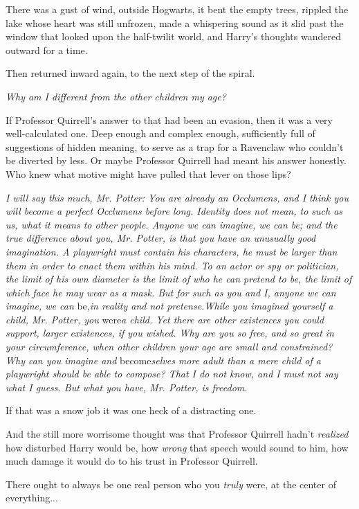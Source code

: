 There was a gust of wind, outside Hogwarts, it bent the empty trees,
rippled the lake whose heart was still unfrozen, made a whispering sound
as it slid past the window that looked upon the half-twilit world, and
Harry's thoughts wandered outward for a time.

Then returned inward again, to the next step of the spiral.

\emph{Why am I different from the other children my age?}

If Professor Quirrell's answer to that had been an evasion, then it was
a very well-calculated one. Deep enough and complex enough, sufficiently
full of suggestions of hidden meaning, to serve as a trap for a
Ravenclaw who couldn't be diverted by less. Or maybe Professor Quirrell
had meant his answer honestly. Who knew what motive might have pulled
that lever on those lips?

\emph{I will say this much, Mr. Potter: You are already an Occlumens,
and I think you will become a perfect Occlumens before long. Identity
does not mean, to such as us, what it means to other people. Anyone we
can imagine, we can be; and the true difference about you, Mr. Potter,
is that you have an unusually good imagination. A playwright must
contain his characters, he must be larger than them in order to enact
them within his mind. To an actor or spy or politician, the limit of his
own diameter is the limit of who he can pretend to be, the limit of
which face he may wear as a mask. But for such as you and I, anyone we
can imagine, we can} be,\emph{in reality and not pretense.}\emph{While
you imagined yourself a child, Mr. Potter, you} were\emph{a child. Yet
there are other existences you could support, larger existences, if you
wished. Why are you so free, and so great in your circumference, when
other children your age are small and constrained? Why can you imagine
and} become\emph{selves more adult than a mere child of a playwright
should be able to compose? That I do not know, and I must not say what I
guess. But what you have, Mr. Potter, is freedom.}

If that was a snow job it was one heck of a distracting one.

And the still more worrisome thought was that Professor Quirrell hadn't
\emph{realized} how disturbed Harry would be, how \emph{wrong} that
speech would sound to him, how much damage it would do to his trust in
Professor Quirrell.

There ought to always be one real person who you \emph{truly} were, at
the center of everything...

